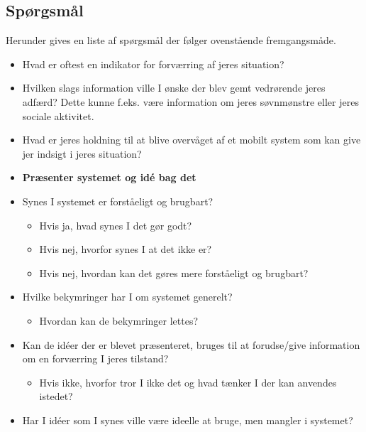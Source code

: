 \subsection*{Spørgsmål}
Herunder gives en liste af spørgsmål der følger ovenstående fremgangsmåde.

\begin{itemize}
\item Hvad er oftest en indikator for forværring af jeres situation?
\item Hvilken slags information ville I ønske der blev gemt vedrørende jeres adfærd? Dette kunne f.eks. være information om jeres søvnmønstre eller jeres sociale aktivitet.
\item Hvad er jeres holdning til at blive overvåget af et mobilt system som kan give jer indsigt i jeres situation?
\item \textbf{Præsenter systemet og idé bag det}
\item Synes I systemet er forståeligt og brugbart?
	   \begin{itemize}
	   \item Hvis ja, hvad synes I det gør godt?
	   \item Hvis nej, hvorfor synes I at det ikke er?
	   \item Hvis nej, hvordan kan det gøres mere forståeligt og brugbart?
	   \end{itemize}
\item Hvilke bekymringer har I om systemet generelt?
	  \begin{itemize}
	  \item Hvordan kan de bekymringer lettes?
	  \end{itemize}
\item Kan de idéer der er blevet præsenteret, bruges til at forudse/give information om en forværring I jeres tilstand?
	   \begin{itemize}
	   \item Hvis ikke, hvorfor tror I ikke det og hvad tænker I der kan anvendes istedet?
	   \end{itemize}
\item Har I idéer som I synes ville være ideelle at bruge, men mangler i systemet?
\end{itemize}